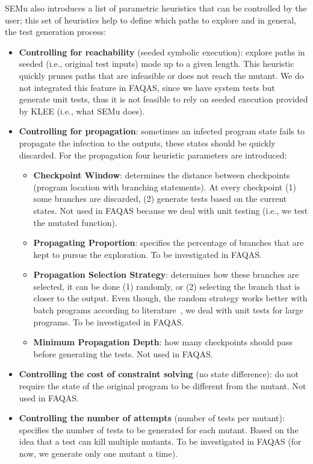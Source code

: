 SEMu also introduces a list of parametric heuristics that can be controlled by the user; this set of heuristics help to define which paths to explore and in general, the test generation process:

\begin{itemize}
	\item \textbf{Controlling for reachability} (seeded symbolic execution): explore paths in seeded (i.e., original test inputs) mode up to a given length. This heuristic quickly prunes paths that are infeasible or does not reach the mutant. We do not integrated this feature in FAQAS, since we have system tests but generate unit tests, thus it is not feasible to rely on seeded execution provided by KLEE (i.e., what SEMu does).

	\item \textbf{Controlling for propagation}: sometimes an infected program state fails to propagate the infection to the outputs, these states should be quickly discarded. For the propagation four heuristic parameters are introduced:
	\begin{itemize}
		\item \textbf{Checkpoint Window}: determines the distance between checkpoints (program location with branching statements). At every checkpoint (1) some branches are discarded, (2) generate tests based on the current states. Not used in FAQAS because we deal with unit testing (i.e., we test the mutated function).
		\item \textbf{Propagating Proportion}: specifies the percentage of branches that are kept to pursue the exploration. To be investigated in FAQAS.
		\item \textbf{Propagation Selection Strategy}: determines how these branches are selected, it can be done (1) randomly, or (2) selecting the branch that is closer to the output. Even though, the random strategy works better with batch programs according to literature~\cite{chekam2021killing}, we deal with unit tests for large programs. To be investigated in FAQAS. 
	\item \textbf{Minimum Propagation Depth}: how many checkpoints should pass before generating the tests. Not used in FAQAS.
	\end{itemize}


	\item \textbf{Controlling the cost of constraint solving} (no state difference): do not require the state of the original program to be different from the mutant. Not used in FAQAS.

	\item \textbf{Controlling the number of attempts} (number of tests per mutant): specifies the number of tests to be generated for each mutant. Based on the idea that a test can kill multiple mutants. To be investigated in FAQAS (for now, we generate only one mutant a time).

\end{itemize}




